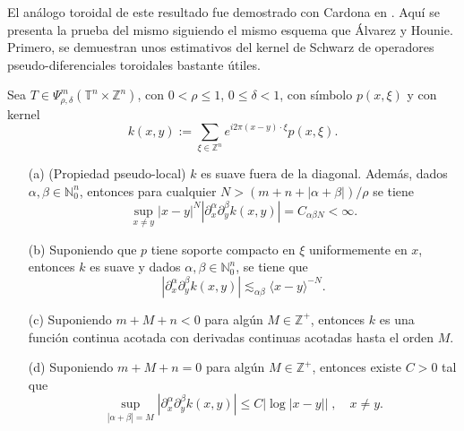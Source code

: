 El análogo toroidal de este resultado fue demostrado con Cardona en 
\cite{Cardona:Martinez}. Aquí se presenta la prueba del mismo siguiendo el mismo esquema que \'Alvarez y Hounie. Primero, se demuestran unos estimativos del kernel de Schwarz de operadores pseudo-diferenciales toroidales bastante útiles.
\begin{theorem}
	Sea $T \in \Psi^m_{\rho, \delta}(\mathbb{T}^n \times \mathbb{Z}^n) $, con $0 < \rho \leq 1$, $0 \leq \delta < 1$, con símbolo $p(x, \xi)$ y con kernel
	\begin{equation}
		k(x, y) := \sum_{\xi \in \mathbb{Z}^n} e^{i2\pi(x - y) \cdot \xi} p(x, \xi).
	\end{equation}
	\begin{enumerate}
		\item[(a)] (Propiedad pseudo-local) $k$ es suave fuera de la diagonal. Además, dados $\alpha, \beta \in \mathbb{N}^n_0$, entonces para cualquier $N > (m + n + |\alpha + \beta|)/\rho$ se tiene
		\begin{equation}
			\sup_{x \neq y} |x - y|^N |\partial^\alpha_x \partial^\beta_y k(x, y)| = C_{\alpha\beta N} < \infty.
			\label{eq:teo3-1a}
		\end{equation}
		\item[(b)] Suponiendo que $p$ tiene soporte compacto en $\xi$ uniformemente en $x$, entonces $k$ es suave y dados $\alpha, \beta \in \mathbb{N}^n_0$, se tiene que 
		\begin{equation}
			|\partial^\alpha_x \partial^\beta_y k(x, y)| \lesssim_{\alpha\beta} \langle x - y \rangle^{-N}.
		\end{equation}
		\item[(c)] Suponiendo $m + M + n < 0$ para algún $M \in \mathbb{Z}^+$, entonces $k$ es una función continua acotada con derivadas continuas acotadas hasta el orden $M$.\\
		\item[(d)] Suponiendo $m + M + n = 0$ para algún $M \in \mathbb{Z}^+$, entonces existe $ C >0$ tal que 
		\begin{equation}
			\sup_{|\alpha + \beta| = M} |\partial^\alpha_x \partial^\beta_y k(x, y)| \leq C | \log |x-y| | \; , \quad x \neq y.
		\end{equation} 
	\end{enumerate}
\end{theorem}
